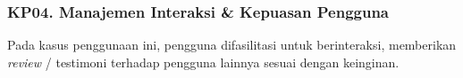\subsubsection{KP04. Manajemen Interaksi \& Kepuasan Pengguna}
\label{kp04}

Pada kasus penggunaan ini, pengguna difasilitasi untuk berinteraksi, memberikan \textit{review} / testimoni terhadap pengguna lainnya sesuai dengan keinginan.

	
	
	
	
	
	
	

	
	
	